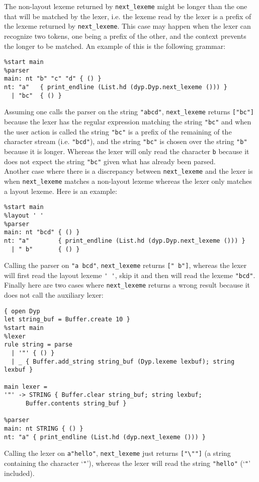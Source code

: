 \documentclass[12pt]{article}
\begin{document}
{The non-layout lexeme returned by \verb|next_lexeme| might be longer than the one that will be matched by the lexer, i.e. the lexeme read by the lexer is a prefix of the lexeme returned by \verb|next_lexeme|. This case may happen when the lexer can recognize two tokens, one being a prefix of the other, and the context prevents the longer to be matched. An example of this is the following grammar:
\begin{verbatim}
%start main
%parser
main: nt "b" "c" "d" { () }
nt: "a"   { print_endline (List.hd (dyp.Dyp.next_lexeme ())) }
  | "bc"  { () }
\end{verbatim}
Assuming one calls the parser on the string \verb|"abcd"|, \verb|next_lexeme| returns \verb|["bc"]| because the lexer has the regular expression matching the string \verb|"bc"| and when the user action is called the string \verb|"bc"| is a prefix of the remaining of the character stream (i.e. \verb|"bcd"|), and the string \verb|"bc"| is chosen over the string \verb|"b"| because it is longer.
Whereas the lexer will only read the character \verb|b| because it does not expect the string \verb|"bc"| given what has already been parsed.\\

Another case where there is a discrepancy between \verb|next_lexeme| and the lexer is when \verb|next_lexeme| matches a non-layout lexeme whereas the lexer only matches a layout lexeme. Here is an example:
\begin{verbatim}
%start main
%layout ' '
%parser
main: nt "bcd" { () }
nt: "a"        { print_endline (List.hd (dyp.Dyp.next_lexeme ())) }
  | " b"       { () }
\end{verbatim}
Calling the parser on \verb|"a bcd"|, \verb|next_lexeme| returns \verb|[" b"]|, whereas the lexer will first read the layout lexeme \verb|' '|, skip it and then will read the lexeme \verb|"bcd"|.\\

Finally here are two cases where \verb|next_lexeme| returns a wrong result because it does not call the auxiliary lexer:
\begin{verbatim}
{ open Dyp
let string_buf = Buffer.create 10 }
%start main
%lexer
rule string = parse
  | '"' { () }
  | _ { Buffer.add_string string_buf (Dyp.lexeme lexbuf); string lexbuf }

main lexer =
'"' -> STRING { Buffer.clear string_buf; string lexbuf;
      Buffer.contents string_buf }

%parser
main: nt STRING { () }
nt: "a" { print_endline (List.hd (dyp.next_lexeme ())) }
\end{verbatim}
Calling the lexer on \verb|a"hello"|, \verb|next_lexeme| just returns \verb|["\""]| (a string containing the character `\verb|"|'), whereas the lexer will read the string \verb|"hello"| (`\verb|"|' included).\\

}
\end{document}
